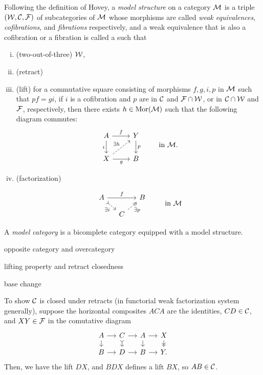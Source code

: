 \documentclass{../../large}
\begin{document}
\begin{prb}
Following the definition of Hovey, a \emph{model structure} on a category $\mathcal{M}$ is a triple $(\mathcal{W},\mathcal{C},\mathcal{F})$ of subcategories of $\mathcal{M}$ whose morphisms are called \emph{weak equivalences}, \emph{cofibrations}, and \emph{fibrations} respectively, and a weak equivalence that is also a cofibration or a fibration is called a \emph{} such that
\begin{enumerate}[(i)]
\item (two-out-of-three)
$\mathcal{W}$,
\item (retract)
\item (lift)
for a commutative square consisting of morphisms $f,g,i,p$ in $\mathcal{M}$ such that $pf=gi$, if $i$ is a cofibration and $p$ are in $\mathcal{C}$ and $\mathcal{F}\cap\mathcal{W}$, or in $\mathcal{C}\cap\mathcal{W}$ and $\mathcal{F}$, respectively, then there exists $h\in\operatorname{Mor}(\mathcal{M})$ such that the following diagram commutes:
\[\begin{tikzcd}
A \dar[swap]{i} \rar{f} & Y \dar{p} \\
X \rar[swap]{g} \ar[dashed]{ur}{\exists h} & B
\end{tikzcd}\qquad\text{ in }\cM.\]

\item (factorization)

\[\begin{tikzcd}[sep=small]
A \ar{rr}{f} \ar[>->,dashed,swap]{dr}{\exists i} && B\\
& C \ar[->>,dashed,swap]{ur}{\exists p} &
\end{tikzcd}\qquad\text{ in }\cM\]
\end{enumerate}
A \emph{model category} is a bicomplete category equipped with a model structure.

\begin{parts}
\item opposite category and overcategory
\item lifting property and retract closedness
\item base change
\end{parts}
\end{prb}
\begin{pf}
To show $\mathcal{C}$ is closed under retracts (in functorial weak factorization system generally), suppose the horizontal composites $ACA$ are the identities, $CD\in\mathcal{C}$, and $XY\in\mathcal{F}$ in the comutative diagram
\[\begin{tikzcd}[sep=small]
A\rar\dar&C\rar\dar[>->]&A\rar\dar&X\dar[->>]\\
B\rar&D\rar&B\rar&Y.
\end{tikzcd}\]
Then, we have the lift $DX$, and $BDX$ defines a lift $BX$, so $AB\in\mathcal{C}$.

\end{pf}
\end{document}
